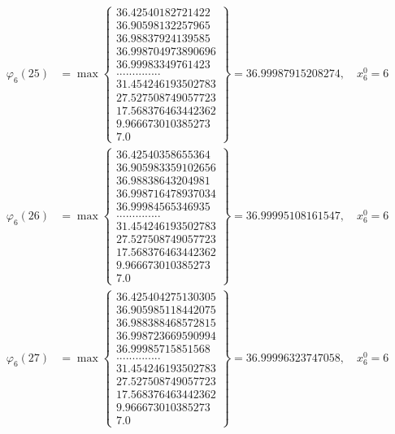 \documentclass{article}
\begin{document}
\begin{align*}
  
  
  
\varphi_{6}(25) &= \max \left\{ \begin{array}{c}
36.42540182721422 \\
 36.90598132257965 \\
 36.98837924139585 \\
 36.998704973890696 \\
 36.99983349761423 \\
 .............. \\
 31.454246193502783 \\
 27.527508749057723 \\
 17.568376463442362 \\
 9.966673010385273 \\
 7.0
\end{array} \right\} = 36.99987915208274, \quad x_{6}^0 = 6\\
  
  
  
  
\varphi_{6}(26) &= \max \left\{ \begin{array}{c}
36.42540358655364 \\
 36.905983359102656 \\
 36.98838643204981 \\
 36.998716478937034 \\
 36.99984565346935 \\
 .............. \\
 31.454246193502783 \\
 27.527508749057723 \\
 17.568376463442362 \\
 9.966673010385273 \\
 7.0
\end{array} \right\} = 36.99995108161547, \quad x_{6}^0 = 6\\
  
  
  
  
\varphi_{6}(27) &= \max \left\{ \begin{array}{c}
36.425404275130305 \\
 36.905985118442075 \\
 36.988388468572815 \\
 36.998723669590994 \\
 36.99985715851568 \\
 .............. \\
 31.454246193502783 \\
 27.527508749057723 \\
 17.568376463442362 \\
 9.966673010385273 \\
 7.0
\end{array} \right\} = 36.99996323747058, \quad x_{6}^0 = 6\\
  

\end{align*}
\end{document}
